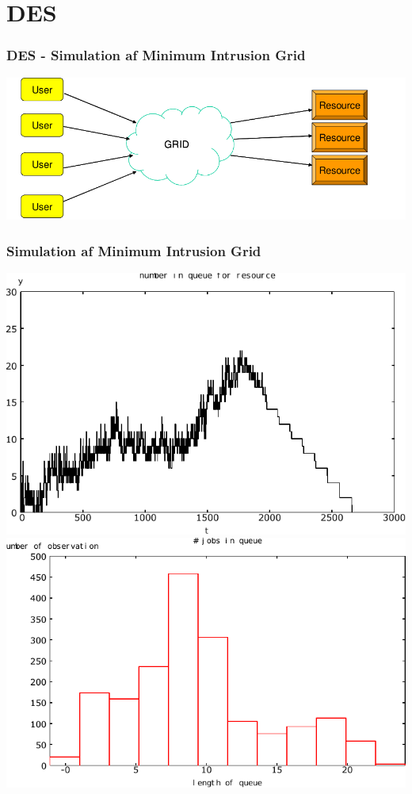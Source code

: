\documentclass[12pt]{beamer}
\begin{document}
\section{DES}
\begin{frame}
  \frametitle{DES -  Simulation af Minimum Intrusion Grid
}
  \includegraphics[scale=0.3]{mig}  
\end{frame}

\begin{frame}
  \frametitle{Simulation af Minimum Intrusion Grid
}
  \includegraphics[scale=0.4]{tidsmodel-1}
  \includegraphics[scale=0.4]{queue}
\end{frame}
\end{document}

